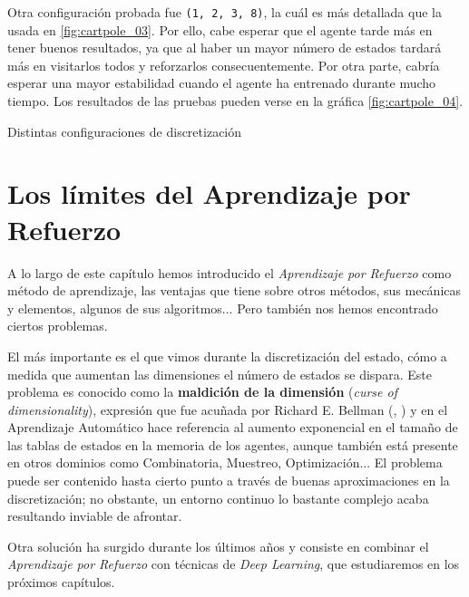 Otra configuración probada fue \texttt{(1, 2, 3, 8)}, la cuál es más detallada que la usada en \ref{fig:cartpole_03}. Por ello, cabe esperar que el agente tarde más en tener buenos resultados, ya que al haber un mayor número de estados tardará más en visitarlos todos y reforzarlos consecuentemente. Por otra parte, cabría esperar una mayor estabilidad cuando el agente ha entrenado durante mucho tiempo. Los resultados de las pruebas pueden verse en la gráfica \ref{fig:cartpole_04}.

%
       {Distintas configuraciones de discretización}


\section{Los límites del Aprendizaje por Refuerzo}
A lo largo de este capítulo hemos introducido el \textit{Aprendizaje por Refuerzo} como método de aprendizaje, las ventajas que tiene sobre otros métodos, sus mecánicas y elementos, algunos de sus algoritmos... Pero también nos hemos encontrado ciertos problemas.

El más importante es el que vimos durante la discretización del estado, cómo a medida que aumentan las dimensiones el número de estados se dispara. Este problema es conocido como la \textbf{maldición de la dimensión} (\textit{curse of dimensionality}), expresión que fue acuñada por Richard E. Bellman (\citet{bellman1957dynamic}, \citet{bellman1961adaptive}) y en el Aprendizaje Automático hace referencia al aumento exponencial en el tamaño de las tablas de estados en la memoria de los agentes, aunque también está presente en otros dominios como Combinatoria, Muestreo, Optimización... El problema puede ser contenido hasta cierto punto a través de buenas aproximaciones en la discretización; no obstante, un entorno continuo lo bastante complejo acaba resultando inviable de afrontar.

Otra solución ha surgido durante los últimos años y consiste en combinar el \textit{Aprendizaje por Refuerzo} con técnicas de \textit{Deep Learning}, que estudiaremos en los próximos capítulos.
